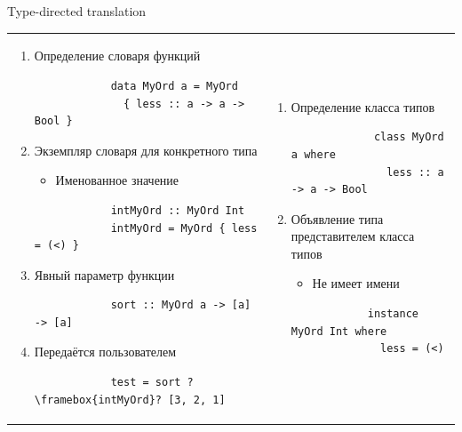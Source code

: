     \begin{frame}[fragile]{Type-directed translation}
        \begin{tabular}{p{7cm}p{7cm}}
            \begin{enumerate}
                \item Определение словаря функций
                \begin{verbatim}
            data MyOrd a = MyOrd
              { less :: a -> a -> Bool }
                \end{verbatim}
                \item Экземпляр словаря для конкретного типа
                \begin{itemize}
                    \item Именованное значение
                \end{itemize}
                \begin{verbatim}
            intMyOrd :: MyOrd Int
            intMyOrd = MyOrd { less = (<) }
                \end{verbatim}
                \item Явный параметр функции
                \begin{verbatim}
            sort :: MyOrd a -> [a] -> [a]
                \end{verbatim}
                \item Передаётся пользователем
                \begin{verbatim}
            test = sort ?\framebox{intMyOrd}? [3, 2, 1]
                \end{verbatim}
            \end{enumerate}
            &
            \begin{enumerate}
                \item Определение класса типов
                \begin{verbatim}
             class MyOrd a where
               less :: a -> a -> Bool
                \end{verbatim}
                \item Объявление типа представителем класса типов
                \begin{itemize}
                    \item Не имеет имени
                \end{itemize}
                \begin{verbatim}
            instance MyOrd Int where
              less = (<)

\end{verbatim}
\end{enumerate}
\end{tabular}
\end{frame}
